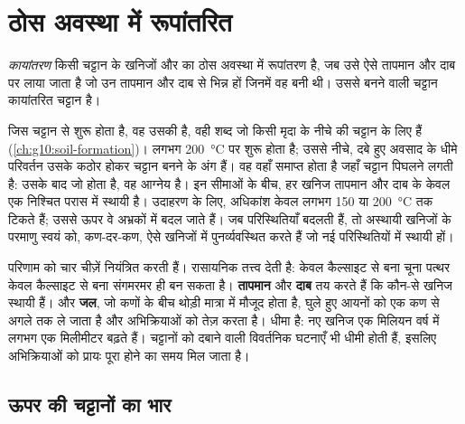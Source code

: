 \section{ठोस अवस्था में रूपांतरित}

\begin{definition}[कायांतरण]\label{def:g12:metamorphic-rocks:metamorphism}
\emph{कायांतरण} किसी चट्टान के खनिजों और  का ठोस अवस्था में
रूपांतरण है, जब उसे ऐसे तापमान और दाब पर लाया जाता है जो उन तापमान और दाब से भिन्न हों
जिनमें वह बनी थी।
उससे बनने वाली चट्टान कायांतरित चट्टान है।
\end{definition}

 जिस चट्टान से शुरू होता है, वह उसकी  है, वही शब्द जो
किसी मृदा के नीचे की चट्टान के लिए हैं (\cref{ch:g10:soil-formation})।  लगभग \qty{200}{\celsius} पर शुरू होता है; उससे नीचे,
दबे हुए अवसाद के धीमे परिवर्तन उसके कठोर होकर चट्टान बनने के अंग हैं। वह
वहाँ समाप्त होता है जहाँ चट्टान पिघलने लगती है: उसके बाद जो होता है, वह आग्नेय है। इन
सीमाओं के बीच, हर खनिज तापमान और दाब के केवल एक निश्चित परास में
स्थायी है। उदाहरण के लिए, अधिकांश  केवल लगभग 150 या
\qty{200}{\celsius} तक टिकते हैं; उससे ऊपर वे अभ्रकों में बदल जाते हैं। जब
परिस्थितियाँ बदलती हैं, तो अस्थायी खनिजों के परमाणु स्वयं को, कण-दर-कण,
ऐसे खनिजों में पुनर्व्यवस्थित करते हैं जो नई परिस्थितियों में स्थायी हों।

परिणाम को चार चीज़ें नियंत्रित करती हैं। \textbf{} रासायनिक
तत्त्व देती है: केवल कैल्साइट से बना चूना पत्थर केवल कैल्साइट से बना
संगमरमर ही बन सकता है। \textbf{तापमान} और \textbf{दाब} तय करते हैं कि कौन-से
खनिज स्थायी हैं। और \textbf{जल}, जो कणों के बीच थोड़ी मात्रा में मौजूद होता है,
घुले हुए आयनों को एक कण से अगले तक ले जाता है और अभिक्रियाओं को तेज़
करता है।  धीमा है: नए खनिज एक मिलियन वर्ष में लगभग एक मिलीमीटर बढ़ते
हैं। चट्टानों को दबाने वाली विवर्तनिक घटनाएँ भी धीमी होती हैं, इसलिए
अभिक्रियाओं को प्रायः पूरा होने का समय मिल जाता है।

\subsection{ऊपर की चट्टानों का भार}

